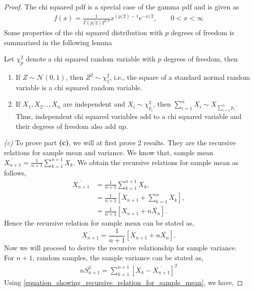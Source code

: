 \documentclass[a4paper,english,12pt]{article}
\begin{document}
\begin{proof}
The chi squared pdf is a special case of the gamma pdf and is given as 
\begin{align}
f(x)=\frac{1}{\Gamma(p/2)2^{p/2}}x^{(p/2)-1}e^{-x/2}, \qquad 0<x<\infty 
\end{align}
Some properties of the chi squared distribution with $p$ degrees of freedom is summarized in the following lemma 
\begin{lem} \label{lemma_5.3.2_casella_berger}
Let $\chi _p^2$ denote a chi squared random variable with $p$ degrees of freedom, then 
\renewcommand{\labelenumi}{\alph{enumi})}
\begin{enumerate}
\item If $Z\sim \mathcal{N}(0,1)$, then $Z^2 \sim \chi_1^2$, i.e., the  square of a standard normal random variable is a chi squared random variable. 
\item If $X_1,X_2\dots , X_n$ are independent and $X_i\sim \chi _{p_i}^2$, then $\sum_{i=1}^nX_i\sim X_{\sum_{i=1}^np_i}$. Thus, independent chi squared variables add to a chi squared variable and their degrees of freedom also add up. 
\end{enumerate}
\end{lem}
\textit{(c)} To prove part \textbf{(c)}, we will at first prove 2 results. They are the recursive relations for sample mean and variance. We know that, sample mean $\overline{X_{n+1}}=\frac{1}{n+1} \sum\limits_{k=1}^{n+1} X_{k}$. We obtain the recursive relations for sample mean as follows,
\begin{align}
\overline{X_{n+1}}& =\frac{1}{n+1} \sum\limits_{k=1}^{n+1} X_{k}, \nonumber \\
& = \frac{1}{n+1} [X_{n+1} + \sum\limits_{k=1}^{n} X_{k}], \nonumber \\
& = \frac{1}{n+1} [X_{n+1} + n\overline{X_n}]. \nonumber 
\end{align}
Hence the recursive relation for sample mean can be stated as,
\begin{equation} \label{equation_showing_recursive_relation_for_sample_mean}
\overline{X_{n+1}}= \frac{1}{n+1} [X_{n+1} + n\overline{X_n}].
\end{equation}
Now we will proceed to derive the recursive relationship for sample variance.\\
For $n+1$, random samples, the sample variance can be stated as,
\begin{align}
nS_{n+1} ^2=\sum\limits_{k=1}^{n+1} [X_{k}-\overline{X_{n+1}}]^2
\end{align}
Using \eqref{equation_showing_recursive_relation_for_sample_mean}, we have,

\end{proof}
\end{document}

